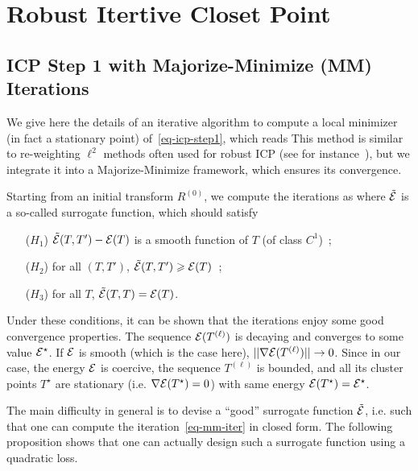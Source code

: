 
\section{Robust Itertive Closet Point}
\label{app-icp}

\subsection{ICP Step 1 with Majorize-Minimize (MM) Iterations}
\label{sec-icp-mm}

We give here the details of an iterative algorithm to compute a local minimizer (in fact a stationary point) of~\eqref{eq-icp-step1}, which reads
This method is similar to re-weighting $\ell^2$ methods often used for robust ICP (see for instance~\cite{BouazizTP13}), but we integrate it into a Majorize-Minimize framework, which ensures its convergence. 

\newcommand{\iter}[1]{ {#1}^{(\ell)} }
\newcommand{\iiter}[1]{ {#1}^{(\ell+1)} }

Starting from an initial transform $R^{(0)}$, we compute the iterations as
\eql{\label{eq-mm-iter}
	\iiter{T} \in \uargmin{T} \tilde\Ee( T,\iter{T} ) 
}
where $\tilde{\mathcal{E}}$ is a so-called surrogate function, which should satisfy
\begin{itemize}
	\item[($H_1$)] $\tilde{\mathcal{E}}(T, T') - \mathcal{E}(T)$ is a smooth function of $T$ (of class $C^1$)~;
	\item[($H_2$)] for all $(T,T')$, $\tilde{\mathcal{E}}(T, T') \geqslant \mathcal{E}(T)$~;
	\item[($H_3$)] for all $T$, $\tilde{\mathcal{E}}(T, T) = \mathcal{E}(T)$.
\end{itemize}
Under these conditions, it can be shown that the iterations enjoy some good convergence properties. The sequence $\Ee(\iter{T})$ is decaying and converges to some value $\mathcal{E}^\star$. If $\mathcal{E}$ is smooth (which is the case here), $\norm{\nabla \Ee(\iter{T})} \rightarrow 0$. Since in our case, the energy $\mathcal{E}$ is coercive, the sequence $\iter{T}$ is bounded, and all its cluster points $T^\star$ are stationary (i.e. $\nabla \mathcal{E}(T^\star)=0$) with same energy $\mathcal{E}(T^\star) = \mathcal{E}^\star$.

The main difficulty in general is to devise a ``good'' surrogate function $\tilde{\mathcal{E}}$, i.e. such that one can compute the iteration~\eqref{eq-mm-iter} in closed form. The following proposition shows that one can actually design such a surrogate function using a quadratic loss. 

